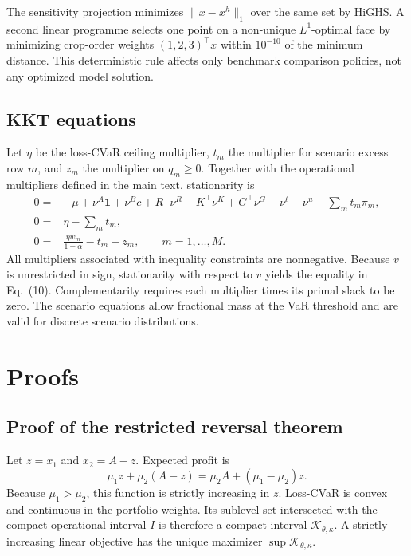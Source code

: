 \documentclass[11pt]{article}
\newcommand{\ind}{\mathbf 1}
\begin{document}
The sensitivity projection minimizes \(\lVert x-x^h\rVert_1\) over the same
set by HiGHS. A second linear programme selects one point on a non-unique
\(L^1\)-optimal face by minimizing crop-order weights \((1,2,3)^\top x\)
within \(10^{-10}\) of the minimum distance. This deterministic rule affects
only benchmark comparison policies, not any optimized model solution.

\subsection{KKT equations}

Let \(\eta\) be the loss-CVaR ceiling multiplier, \(t_m\) the multiplier for
scenario excess row \(m\), and \(z_m\) the multiplier on \(q_m\ge0\). Together
with the operational multipliers defined in the main text, stationarity is
\begin{align}
0={}&-\mu+\nu^A\ind+\nu^B c+R^\top\nu^R-K^\top\nu^K+
G^\top\nu^G-\nu^\ell+\nu^u-\sum_mt_m\pi_m,\\
0={}&\eta-\sum_mt_m,\\
0={}&\frac{\eta w_m}{1-\alpha}-t_m-z_m,\qquad m=1,\ldots,M.
\end{align}
All multipliers associated with inequality constraints are nonnegative.
Because \(v\) is unrestricted in sign, stationarity with respect to \(v\)
yields the equality in Eq.~(10). Complementarity requires each multiplier
times its primal slack to be zero. The scenario equations allow fractional
mass at the VaR threshold and are valid for discrete scenario distributions.

\section{Proofs}

\subsection{Proof of the restricted reversal theorem}

Let \(z=x_1\) and \(x_2=A-z\). Expected profit is
\[
\mu_1z+\mu_2(A-z)=\mu_2A+(\mu_1-\mu_2)z.
\]
Because \(\mu_1>\mu_2\), this function is strictly increasing in \(z\).
Loss-CVaR is convex and continuous in the portfolio weights. Its sublevel set
intersected with the compact operational interval \(I\) is therefore a compact
interval \(\mathcal K_{\theta,\kappa}\). A strictly increasing linear
objective has the unique maximizer \(\sup\mathcal K_{\theta,\kappa}\).
\end{document}
